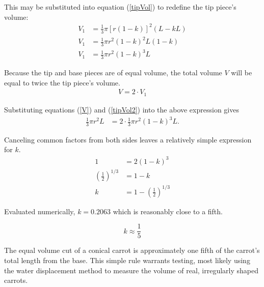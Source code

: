 \documentclass[a4paper, 12pt]{article}
\begin{document}
This may be substituted into equation (\ref{tipVol}) to redefine the tip piece's volume:
	\begin{align}
		V_1 &= \frac{1}{3}\pi [r(1-k)]^2 (L-kL)\nonumber\\
		V_1 &= \frac{1}{3}\pi r^2 (1-k)^2 L(1-k)\nonumber\\
		V_1 &= \frac{1}{3}\pi r^2 (1-k)^3 L \label{tipVol2}
	\end{align}

Because the tip and base pieces are of equal volume, the total volume $V$ will be equal to twice the tip piece's volume.
	\begin{align*}
		V = 2\cdot V_1
	\end{align*}

Substituting equations (\ref{V}) and (\ref{tipVol2}) into the above expression gives
	\begin{align*}
		 \frac{1}{3}\pi r^2 L &= 2\cdot \frac{1}{3}\pi r^2(1-k)^3 L.
	\end{align*}

Canceling common factors from both sides leaves a relatively simple expression for $k$.
	\begin{align}
		1 &= 2(1-k)^3\nonumber\\
		\left(\frac{1}{2}\right)^{1/3} &= 1-k\nonumber\\
		k &= 1 - \left(\frac{1}{2}\right)^{1/3}
	\end{align}

Evaluated numerically, $k = 0.2063$ which is reasonably close to a fifth.

	\begin{equation}
		\boxed{k \approx \frac{1}{5}}
	\end{equation}
	
The equal volume cut of a conical carrot is approximately one fifth of the carrot's total length from the base. This simple rule warrants testing, most likely using the water displacement method to measure the volume of real, irregularly shaped carrots.


	
\end{document}
